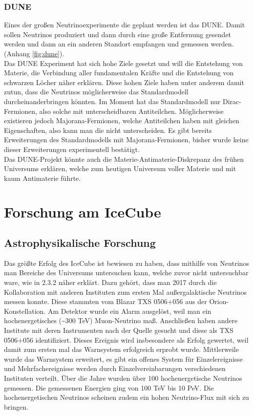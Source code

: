 \subsubsection{DUNE}

Eines der großen Neutrinoexperimente die geplant werden ist das DUNE. Damit sollen Neutrinos produziert
und dann durch eine große Entfernung gesendet werden und dann an ein anderen Standort empfangen und gemessen werden.
(Anhang \ref{fig:dune}). \\ Das DUNE Experiment hat sich hohe Ziele gesetzt und will die Entstehung von Materie,
die Verbindung aller fundamentalen Kräfte und die Entstehung von schwarzen Löcher näher erklären.
Diese hohen Ziele haben unter anderem damit zutun, dass die Neutrinos möglicherweise das Standardmodell
durcheinanderbringen könnten. Im Moment hat das Standardmodell nur Dirac-Fermionen, also solche mit unterscheidbaren Antiteilchen.
Möglicherweise existieren jedoch Majorana-Fermionen, welche Antiteilchen haben mit gleichen Eigenschaften, also
kann man die nicht unterscheiden. Es gibt bereits Erweiterungen des Standardmodells mit Majorana-Fermionen, bisher
wurde keine dieser Erweiterungen experimentell bestätigt. \\ Das DUNE-Projekt könnte auch die
Materie-Antimaterie-Diskrepanz des frühen Universums erklären, welche zum heutigen Universum voller Materie
und mit kaum Antimaterie führte.

\section{Forschung am IceCube}

\subsection{Astrophysikalische Forschung}

Das größte Erfolg des IceCube ist bewiesen zu haben, dass mithilfe von Neutrinos man Bereiche des Universums
untersuchen kann, welche zuvor nicht untersuchbar ware, wie in 2.3.2 näher erklärt.
Dazu gehört, dass man 2017 durch die Kollaboration mit anderen Instituten zum ersten Mal
außergalaktische Neutrinos messen konnte. Diese stammten vom Blazar TXS 0506+056 aus der Orion-Konstellation.
Am Detektor wurde ein Alarm ausgelöst, weil man ein hochenergetisches (\textasciitilde 300 TeV) Muon-Neutrino maß. Anschließen
haben andere Institute mit deren Instrumenten nach der Quelle gesucht und diese als TXS 0506+056 identifiziert.
Dieses Ereignis wird insbesondere als Erfolg gewertet, weil damit zum ersten mal das Warnsystem erfolgreich erprobt
wurde. Mittlerweile wurde das Warnsystem erweitert, es gibt ein offenes System für Einzelereignisse und Mehrfachereignisse werden
durch Einzelvereinbarungen verschiedenen Instituten verteilt.
Über die Jahre wurden über 100 hochenergetische Neutrinos gemessen. Die gemessenen Energien ging von 100 TeV bis 10 PeV.
Die hochenergetischen Neutrinos scheinen zudem ein hohen Neutrino-Flux mit sich zu bringen.
\cite{WiMa2018}

